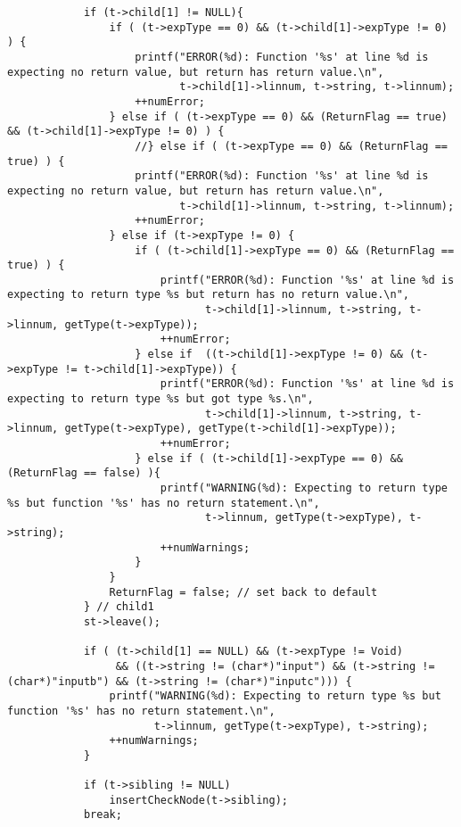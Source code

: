 \documentclass[12pt]{book}
\begin{document}
\begin{lstlisting}
            if (t->child[1] != NULL){
                if ( (t->expType == 0) && (t->child[1]->expType != 0) ) {
                    printf("ERROR(%d): Function '%s' at line %d is expecting no return value, but return has return value.\n", 
                           t->child[1]->linnum, t->string, t->linnum);
                    ++numError;
                } else if ( (t->expType == 0) && (ReturnFlag == true) && (t->child[1]->expType != 0) ) {
                    //} else if ( (t->expType == 0) && (ReturnFlag == true) ) {
                    printf("ERROR(%d): Function '%s' at line %d is expecting no return value, but return has return value.\n", 
                           t->child[1]->linnum, t->string, t->linnum);
                    ++numError;
                } else if (t->expType != 0) {
                    if ( (t->child[1]->expType == 0) && (ReturnFlag == true) ) {
                        printf("ERROR(%d): Function '%s' at line %d is expecting to return type %s but return has no return value.\n", 
                               t->child[1]->linnum, t->string, t->linnum, getType(t->expType));
                        ++numError;
                    } else if  ((t->child[1]->expType != 0) && (t->expType != t->child[1]->expType)) {
                        printf("ERROR(%d): Function '%s' at line %d is expecting to return type %s but got type %s.\n", 
                               t->child[1]->linnum, t->string, t->linnum, getType(t->expType), getType(t->child[1]->expType));
                        ++numError;
                    } else if ( (t->child[1]->expType == 0) && (ReturnFlag == false) ){
                        printf("WARNING(%d): Expecting to return type %s but function '%s' has no return statement.\n", 
                               t->linnum, getType(t->expType), t->string);
                        ++numWarnings;
                    }
                }
                ReturnFlag = false; // set back to default
            } // child1
            st->leave();

            if ( (t->child[1] == NULL) && (t->expType != Void) 
                 && ((t->string != (char*)"input") && (t->string != (char*)"inputb") && (t->string != (char*)"inputc"))) {
                printf("WARNING(%d): Expecting to return type %s but function '%s' has no return statement.\n", 
                       t->linnum, getType(t->expType), t->string);
                ++numWarnings;
            }

            if (t->sibling != NULL)
                insertCheckNode(t->sibling);
            break;


\end{lstlisting}
\end{document}
